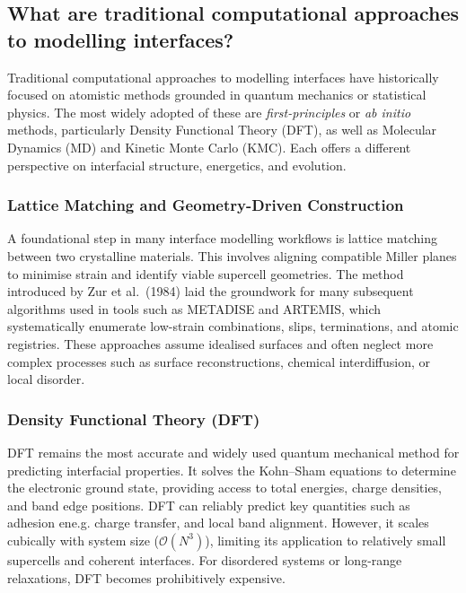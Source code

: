\subsection{What are traditional computational approaches to modelling interfaces?}

Traditional computational approaches to modelling interfaces have historically focused on atomistic methods grounded in
quantum mechanics or statistical physics. The most widely adopted of these are \textit{first-principles} or
\textit{ab initio} methods, particularly Density Functional Theory (DFT), as well as Molecular Dynamics (MD) and
Kinetic Monte Carlo (KMC). Each offers a different perspective on interfacial structure, energetics, and evolution.

\subsubsection{Lattice Matching and Geometry-Driven Construction}

A foundational step in many interface modelling workflows is lattice matching between two crystalline materials.
This involves aligning compatible Miller planes to minimise strain and identify viable supercell geometries. The
method introduced by Zur et al.~(1984) laid the groundwork for many subsequent algorithms used in tools such as
\textsc{METADISE} and \textsc{ARTEMIS}, which systematically enumerate low-strain combinations, slips, terminations,
and atomic registries. These approaches assume idealised surfaces and often neglect more complex processes such as
surface reconstructions, chemical interdiffusion, or local disorder.

\subsubsection{Density Functional Theory (DFT)}

DFT remains the most accurate and widely used quantum mechanical method for predicting interfacial properties. It
solves the Kohn--Sham equations to determine the electronic ground state, providing access to total energies, charge
densities, and band edge positions. DFT can reliably predict key quantities such as adhesion ene.g. charge transfer,
and local band alignment. However, it scales cubically with system size ($\mathcal{O}(N^3)$), limiting its
application to relatively small supercells and coherent interfaces. For disordered systems or long-range
relaxations, DFT becomes prohibitively expensive.

